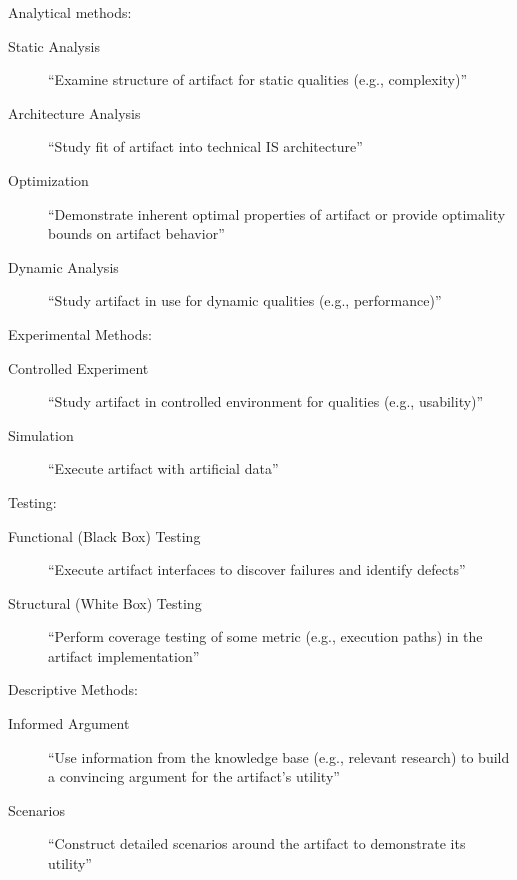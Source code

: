 Analytical methods:

\begin{description}
  \item[Static Analysis] ``Examine structure of artifact for static qualities (e.g., complexity)''
  \item[Architecture Analysis] ``Study fit of artifact into technical IS architecture''
  \item[Optimization] ``Demonstrate inherent optimal properties of artifact or provide optimality bounds on artifact behavior''
  \item[Dynamic Analysis] ``Study artifact in use for dynamic qualities (e.g., performance)''
\end{description}

Experimental Methods:

\begin{description}
  \item[Controlled Experiment] ``Study artifact in controlled environment for qualities (e.g., usability)''
  \item[Simulation] ``Execute artifact with artificial data''
\end{description}

Testing:

\begin{description}
  \item[Functional (Black Box) Testing] ``Execute artifact interfaces to discover failures and identify defects''
  \item[Structural (White Box) Testing] ``Perform coverage testing of some metric (e.g., execution paths) in the artifact implementation''
\end{description}

Descriptive Methods:

\begin{description}
  \item[Informed Argument] ``Use information from the knowledge base (e.g., relevant research) to build a convincing argument for the artifact’s utility''
  \item[Scenarios] ``Construct detailed scenarios around the artifact to demonstrate its utility''
\end{description}





